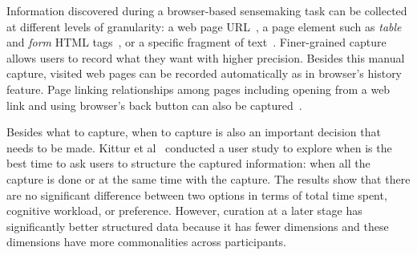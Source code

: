 Information discovered during a browser-based sensemaking task can be collected at different levels of granularity: a web page URL~\cite{Baldonado1997,Gotz2007}, a page element such as \textit{table} and \textit{form} HTML tags~\cite{Schraefel2002,Hong2008}, or a specific fragment of text~\cite{Pioch2006,Nguyen2016}. Finer-grained capture allows users to record what they want with higher precision. Besides this manual capture, visited web pages can be recorded automatically as in browser's history feature. Page linking relationships among pages including opening from a web link and using browser's back button can also be captured~\cite{Ayers1995,Hightower1998,Milic-Frayling2003}.


Besides what to capture, when to capture is also an important decision that needs to be made. Kittur et al~\cite{Kittur2013} conducted a user study to explore when is the best time to ask users to structure the captured information: when all the capture is done or at the same time with the capture. The results show that there are no significant difference between two options in terms of total time spent, cognitive workload, or preference. However, curation at a later stage has significantly better structured data because it has fewer dimensions and these dimensions have more commonalities across participants. 

